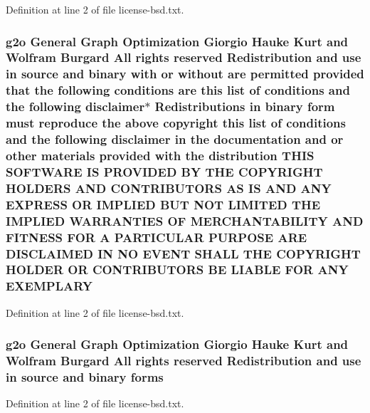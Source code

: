 Definition at line 2 of file license-\/bsd.\+txt.

\subsubsection[{\texorpdfstring{E\+X\+E\+M\+P\+L\+A\+RY}{EXEMPLARY}}]{\setlength{\rightskip}{0pt plus 5cm}g2o General Graph Optimization Giorgio Hauke Kurt and Wolfram Burgard All rights reserved Redistribution and use in source and binary with or without are permitted provided that the following conditions are this list of conditions and the following disclaimer$\ast$ Redistributions in binary form must reproduce the above copyright this list of conditions and the following disclaimer in the documentation and or other materials provided with the distribution T\+H\+IS S\+O\+F\+T\+W\+A\+RE IS P\+R\+O\+V\+I\+D\+ED BY T\+HE C\+O\+P\+Y\+R\+I\+G\+HT H\+O\+L\+D\+E\+RS A\+ND C\+O\+N\+T\+R\+I\+B\+U\+T\+O\+RS AS IS A\+ND A\+NY E\+X\+P\+R\+E\+SS OR I\+M\+P\+L\+I\+ED B\+UT N\+OT L\+I\+M\+I\+T\+ED T\+HE I\+M\+P\+L\+I\+ED {\bf W\+A\+R\+R\+A\+N\+T\+I\+ES} OF M\+E\+R\+C\+H\+A\+N\+T\+A\+B\+I\+L\+I\+TY A\+ND F\+I\+T\+N\+E\+SS F\+OR A P\+A\+R\+T\+I\+C\+U\+L\+AR P\+U\+R\+P\+O\+SE A\+RE D\+I\+S\+C\+L\+A\+I\+M\+ED IN NO E\+V\+E\+NT S\+H\+A\+LL T\+HE C\+O\+P\+Y\+R\+I\+G\+HT H\+O\+L\+D\+ER OR C\+O\+N\+T\+R\+I\+B\+U\+T\+O\+RS BE L\+I\+A\+B\+LE F\+OR A\+NY E\+X\+E\+M\+P\+L\+A\+RY}\hypertarget{license-bsd_8txt_af6233a3b2e06f8ce0d28befaf481421d}{}\label{license-bsd_8txt_af6233a3b2e06f8ce0d28befaf481421d}


Definition at line 2 of file license-\/bsd.\+txt.

\subsubsection[{\texorpdfstring{forms}{forms}}]{\setlength{\rightskip}{0pt plus 5cm}g2o General Graph Optimization Giorgio Hauke Kurt and Wolfram Burgard All rights reserved Redistribution and use in source and binary forms}\hypertarget{license-bsd_8txt_afd7452e1adeebc76058f8da6434ba7a3}{}\label{license-bsd_8txt_afd7452e1adeebc76058f8da6434ba7a3}


Definition at line 2 of file license-\/bsd.\+txt.

